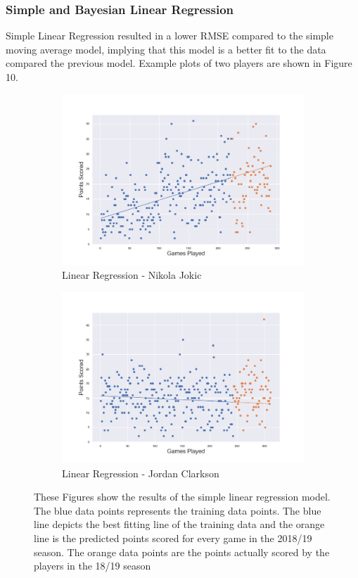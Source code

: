 \documentclass[a4paper,11pt,twoside]{article}
\begin{document}
\subsubsection{Simple and Bayesian Linear Regression}

Simple Linear Regression resulted in a lower RMSE compared to the simple moving average model, implying that this model is a better fit to the data compared the previous model. Example plots of two players are shown in Figure 10. 

\begin{figure} [h!]
\centering
  \begin{subfigure}[b]{0.75\textwidth}
    \includegraphics[width=\textwidth]{../players_lr/player24.png}
    \caption{Linear Regression - Nikola Jokic}
    \label{fig:1}
  \end{subfigure}
  \begin{subfigure}[b]{0.75\textwidth}
    \includegraphics[width=\textwidth]{../players_lr/player26.png}
    \caption{Linear Regression - Jordan Clarkson}
    \label{fig:2}
  \end{subfigure}
\caption{These Figures show the results of the simple linear regression model. The blue data points represents the training data points. The blue line depicts the best fitting line of the training data and the orange line is the predicted points scored for every game in the 2018/19 season. The orange data points are the points actually scored by the players in the 18/19 season}
\end{figure}
\end{document}

